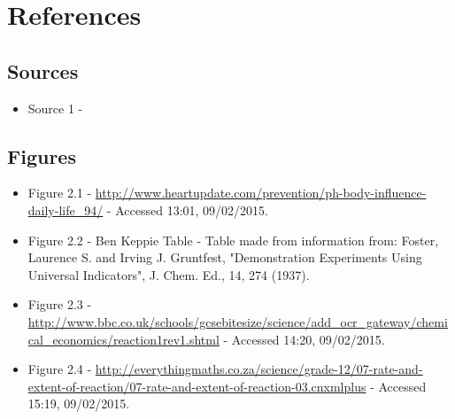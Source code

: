 \chapter{References}

\section{Sources}

\begin{itemize}
\item Source 1 - 
\end{itemize}

\section{Figures}
\begin{itemize}
\item Figure 2.1 - \url{http://www.heartupdate.com/prevention/ph-body-influence-daily-life_94/} - Accessed 13:01, 09/02/2015. 
\item Figure 2.2 - Ben Keppie Table - Table made from information from: Foster, Laurence S. and Irving J. Gruntfest, "Demonstration Experiments Using Universal Indicators", J. Chem. Ed., 14, 274 (1937).
\item Figure 2.3 - \url{http://www.bbc.co.uk/schools/gcsebitesize/science/add_ocr_gateway/chemical_economics/reaction1rev1.shtml} - Accessed 14:20, 09/02/2015.
\item Figure 2.4 - \url{http://everythingmaths.co.za/science/grade-12/07-rate-and-extent-of-reaction/07-rate-and-extent-of-reaction-03.cnxmlplus} - Accessed 15:19, 09/02/2015.
\end{itemize}